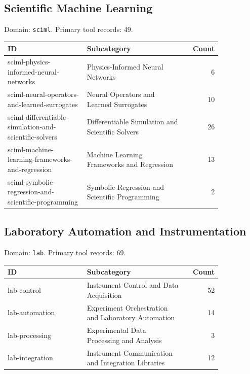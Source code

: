 \subsection{Scientific Machine Learning}
\noindent Domain: \texttt{sciml}. Primary tool records: 49.
\begin{longtable}{p{0.37\linewidth}p{0.47\linewidth}r}
ID & Subcategory & Count\\\hline\endhead
sciml-physics-informed-neural-networks & Physics-Informed Neural Networks & 6\\
sciml-neural-operators-and-learned-surrogates & Neural Operators and Learned Surrogates & 10\\
sciml-differentiable-simulation-and-scientific-solvers & Differentiable Simulation and Scientific Solvers & 26\\
sciml-machine-learning-frameworks-and-regression & Machine Learning Frameworks and Regression & 13\\
sciml-symbolic-regression-and-scientific-programming & Symbolic Regression and Scientific Programming & 2\\
\end{longtable}
\subsection{Laboratory Automation and Instrumentation}
\noindent Domain: \texttt{lab}. Primary tool records: 69.
\begin{longtable}{p{0.37\linewidth}p{0.47\linewidth}r}
ID & Subcategory & Count\\\hline\endhead
lab-control & Instrument Control and Data Acquisition & 52\\
lab-automation & Experiment Orchestration and Laboratory Automation & 14\\
lab-processing & Experimental Data Processing and Analysis & 3\\
lab-integration & Instrument Communication and Integration Libraries & 12\\
\end{longtable}

